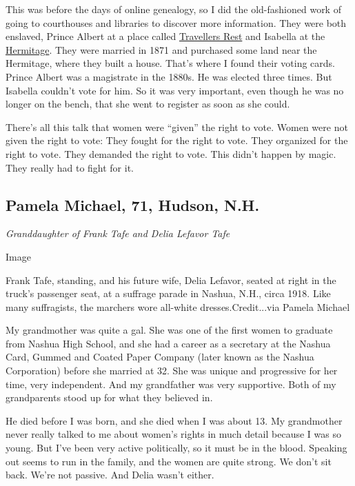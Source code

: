 This was before the days of online genealogy, so I did the old-fashioned
work of going to courthouses and libraries to discover more information.
They were both enslaved, Prince Albert at a place called
\href{https://historictravellersrest.org/}{Travellers Rest} and Isabella
at the \href{https://thehermitage.com/}{Hermitage}. They were married in
1871 and purchased some land near the Hermitage, where they built a
house. That's where I found their voting cards. Prince Albert was a
magistrate in the 1880s. He was elected three times. But Isabella
couldn't vote for him. So it was very important, even though he was no
longer on the bench, that she went to register as soon as she could.

There's all this talk that women were ``given'' the right to vote. Women
were not given the right to vote: They fought for the right to vote.
They organized for the right to vote. They demanded the right to vote.
This didn't happen by magic. They really had to fight for it.

\hypertarget{pamela-michael-71-hudson-nh}{%
\subsection{Pamela Michael, 71, Hudson,
N.H.}\label{pamela-michael-71-hudson-nh}}

\emph{Granddaughter of Frank Tafe and Delia Lefavor Tafe}

Image

Frank Tafe, standing, and his future wife, Delia Lefavor, seated at
right in the truck's passenger seat, at a suffrage parade in Nashua,
N.H., circa 1918. Like many suffragists, the marchers wore all-white
dresses.Credit...via Pamela Michael

My grandmother was quite a gal. She was one of the first women to
graduate from Nashua High School, and she had a career as a secretary at
the Nashua Card, Gummed and Coated Paper Company (later known as the
Nashua Corporation) before she married at 32. She was unique and
progressive for her time, very independent. And my grandfather was very
supportive. Both of my grandparents stood up for what they believed in.

He died before I was born, and she died when I was about 13. My
grandmother never really talked to me about women's rights in much
detail because I was so young. But I've been very active politically, so
it must be in the blood. Speaking out seems to run in the family, and
the women are quite strong. We don't sit back. We're not passive. And
Delia wasn't either.


